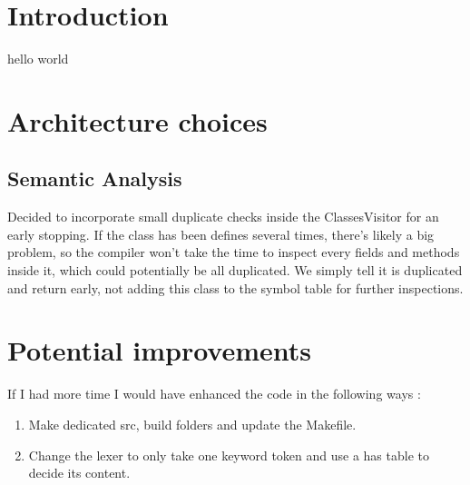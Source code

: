 \documentclass{article}
\begin{document}
\section{Introduction}

hello world

\section{Architecture choices}

\subsection{Semantic Analysis}

Decided to incorporate small duplicate checks inside the ClassesVisitor for an early stopping.
If the class has been defines several times, there's likely a big problem, so the compiler won't take the time to inspect every fields and methods inside it, which could potentially be all duplicated. 
We simply tell it is duplicated and return early, not adding this class to the symbol table for further inspections.

\section{Potential improvements}
If I had more time I would have enhanced the code in the following ways : 

\begin{enumerate}
    \item Make dedicated src, build folders and update the Makefile.
    \item Change the lexer to only take one keyword token and use a has table to decide its content.
\end{enumerate}
\end{document}
